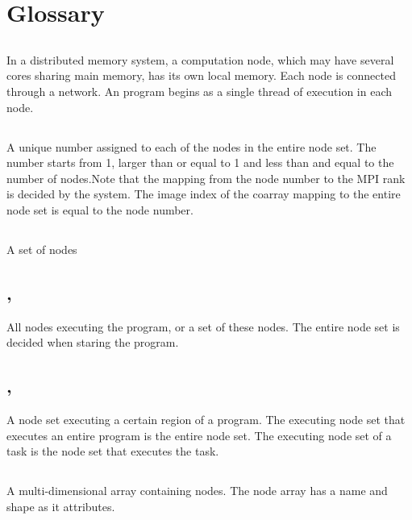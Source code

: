 
\section{Glossary}
\subsection*{}
In a distributed memory system, a computation node, which may have several cores sharing main memory, has its own local memory. Each node is connected through a network. An \XMP program begins as a single thread of execution in each node.

\subsection*{}
A unique number assigned to each of the nodes in the entire node set. The number starts from 1, larger than or equal to 1 and less than and equal to the number of nodes.Note that the mapping from the node number to the MPI rank is decided by the system. The image index of
the coarray mapping to the entire node set is equal to the node number. 

\subsection*{}
A set of nodes

\subsection*{, }
All nodes executing the program, or a set of these nodes. The entire node set is
decided when staring the program.

\subsection*{, }
A node set executing a certain region of a program. The executing node
set that executes an entire program is the entire node set. The executing
node set of a task is the node set that executes the task. 

\subsection*{}
A multi-dimensional array containing nodes. The node array has a
name and shape as it attributes.

